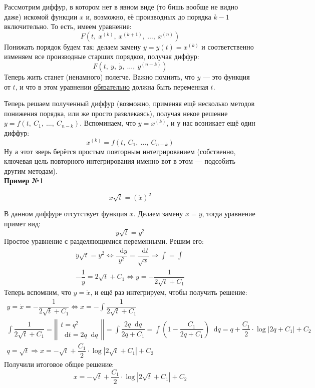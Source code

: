 \documentclass[a4paper,12pt]{article}
\renewcommand*\d{\mathop{}\!\mathrm{d}}
\newcommand{\dy}{\dot{y}}
\newcommand{\dx}{\dot{x}}
\newcommand{\ddx}{\ddot{x}}
\newcommand{\bto}{\Longrightarrow}
\newcommand{\ds}{\displaystyle}
\begin{document}
Рассмотрим диффур, в котором нет в явном виде (то бишь вообще не видно даже) искомой функции $x$ и, возможно, её производных до порядка $k - 1$ включительно. То есть, имеем уравнение:
\[F\left(t,\ x^{(k)},\ x^{(k + 1)},\ \ldots,\ x^{(n)}\right)\]
Понижать порядок будем так: делаем замену $y = y(t) = x^{(k)}$ и соответственно изменяем все производные старших порядков, получая диффур:
\[F\left(t,\ y,\ \dy,\ \ldots,\ y^{(n - k)}\right)\]
Теперь жить станет (ненамного) полегче. Важно помнить, что $y$ --- это функция от $t$, и что в этом уравнении \underline{обязательно} должна быть переменная $t$.

Теперь решаем полученный диффур (возможно, применяя ещё несколько методов понижения порядка, или же просто развлекаясь), получая некое решение $y = f(t,\ C_1,\ \ldots,\ C_{n - k})$. Вспоминаем, что $y = x^{(k)}$, и у нас возникает ещё один диффур:
\[x^{(k)} = f(t,\ C_1,\ \ldots,\ C_{n - k})\]
Ну а этот зверь берётся простым повторным интегрированием (собственно, ключевая цель повторного интегрирования именно вот в этом --- подсобить другим методам). 
\ \\

\textbf{Пример №1}

\[\ddx\sqrt{t} = (\dx)^2\]

В данном диффуре отсутствует функция $x$. Делаем замену $\dx = y$, тогда уравнение примет вид:
\[\dy\sqrt{t} = y^2\]
Простое уравнение с разделяющимися переменными. Решим его:
\begin{gather*}
	\dy\sqrt{t} = y^2 \iff \dfrac{\d y}{y^2} = \dfrac{\d t}{\sqrt{x}} \bto \ds\int = \int\\
	-\dfrac{1}{y} = 2\sqrt{t} + C_1 \iff y = -\dfrac{1}{2\sqrt{t} + C_1}
\end{gather*}
Теперь вспомним, что $y = \dx$, и ещё раз интегрируем, чтобы получить решение:
\begin{gather*}
y = \dx = -\dfrac{1}{2\sqrt{t} + C_1} \iff x = -\ds\int \dfrac{1}{2\sqrt{t} + C_1}\\
\ds\int \dfrac{1}{2\sqrt{t} + C_1} = \left|\left|\begin{gathered}
	t = q^2\\
	\d t = 2q\d q
\end{gathered}\right|\right| = \ds\int\dfrac{2q\d q}{2q + C_1} = \ds\int\left(1 - \dfrac{C_1}{2q + C_1}\right)\d q = q + \dfrac{C_1}{2} \cdot \log|2q + C_1| + C_2\\
q = \sqrt{t} \bto x = -\sqrt{t} + \dfrac{C_1}{2} \cdot \log|2\sqrt{t} + C_1| + C_2
\end{gather*}
Получили итоговое общее решение:
\[x = -\sqrt{t} + \dfrac{C_1}{2} \cdot \log|2\sqrt{t} + C_1| + C_2\]
\end{document}
